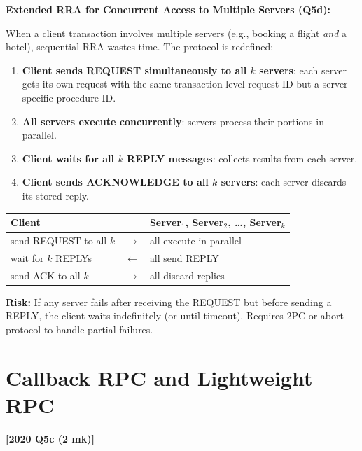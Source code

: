 \documentclass[11pt,a4paper]{article}
\newcommand{\qref}[1]{\textbf{\textcolor{examblue}{[#1]}}}
\newcommand{\mk}[1]{\textcolor{slidegray}{\small(#1 mk)}}
\begin{document}
\begin{answerbox}
\bigskip
\textbf{Extended RRA for Concurrent Access to Multiple Servers (Q5d):}

When a client transaction involves multiple servers (e.g., booking a flight \emph{and} a hotel), sequential RRA wastes time. The protocol is redefined:

\begin{enumerate}
  \item \textbf{Client sends REQUEST simultaneously to all $k$ servers}: each server gets its own request with the same transaction-level request ID but a server-specific procedure ID.
  \item \textbf{All servers execute concurrently}: servers process their portions in parallel.
  \item \textbf{Client waits for all $k$ REPLY messages}: collects results from each server.
  \item \textbf{Client sends ACKNOWLEDGE to all $k$ servers}: each server discards its stored reply.
\end{enumerate}

\begin{center}
\begin{tabular}{lcl}
\textbf{Client} & & \textbf{Server$_1$, Server$_2$, \ldots, Server$_k$} \\
\hline
send REQUEST to all $k$ & $\longrightarrow$ & all execute in parallel \\
wait for $k$ REPLYs & $\longleftarrow$ & all send REPLY \\
send ACK to all $k$ & $\longrightarrow$ & all discard replies \\
\end{tabular}
\end{center}

\textbf{Risk:} If any server fails after receiving the REQUEST but before sending a REPLY, the client waits indefinitely (or until timeout). Requires 2PC or abort protocol to handle partial failures.
\end{answerbox}

\section{Callback RPC and Lightweight RPC}
\qref{2020 Q5c \mk{2}}
\end{document}
